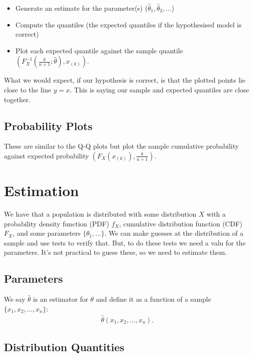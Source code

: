 \documentclass[a4paper, 12pt, twoside]{article}
\begin{document}
\begin{itemize}
    \item Generate an estimate for the parameter(s)
          ($\hat\theta_1, \hat\theta_2, \ldots$)
    \item Compute the quantiles (the expected quantiles if the
          hypothesised model is correct)
    \item Plot each expected quantile against the sample quantile
          $(F_X^{-1}(\frac{k}{n + 1}; \hat\theta), x_{(k)})$.
\end{itemize}

What we would expect, if our hypothesis is correct, is that the
plotted points lie close to the line $y = x$. This is saying our
sample and expected quantiles are close together.

\subsection{Probability Plots}

These are similar to the Q-Q plots but plot the sample cumulative
probability against expected probability $(F_X(x_{(k)}), \frac{k}{n + 1})$.


\section{Estimation}

We have that a population is distributed with some distribution $X$
with a probability density function (PDF) $f_X$, cumulative
distribution function (CDF) $F_X$, and some parameters
$\{\theta_1, \ldots\}$. We can make guesses at the distribution of a sample and use tests to
verify that. But, to do these tests we need a valu for the parameters.
It's not practical to guess these, so we need to estimate them.

\subsection{Parameters}

We say $\hat{\theta}$ is an estimator for $\theta$ and define it as
a function of a sample $\{x_1, x_2, \ldots, x_n\}$:
\begin{align*}
    \hat{\theta}(x_1, x_2, \ldots, x_n).
\end{align*}

\subsection{Distribution Quantities}
\end{document}
